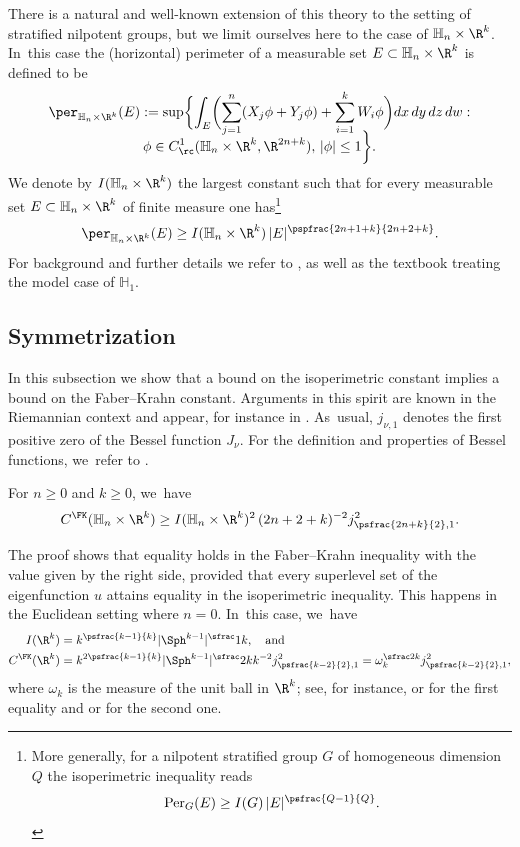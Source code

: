 There is a natural and well-known extension of this theory to the setting of stratified nilpotent groups, but we limit ourselves here to the case of $\mathbb H_n\times\R^k$. In~this case the (horizontal) perimeter of a measurable set $E\subset\mathbb H_n\times\R^k$ is defined to be
\begin{multline*}
\per_{\mathbb H_n\times\R^k}(E):=\sup\biggl\{ \int_E \biggl(\sum_{j=1}^n (X_j\phi+Y_j\phi) + \sum_{i=1}^k W_i\phi\biggr) dx\,dy\,dz\,dw : \\[-8pt]
\phi\in C^1_\rc(\mathbb H_n\times\R^k,\R^{2n+k}),\,|\phi|\leq 1\biggr\}.
\end{multline*}
We denote by $I(\mathbb H_n\times\R^k)$ the largest constant such that for every measurable set $E\subset\mathbb H_n\times\R^k$ of finite measure one has\footnote{More generally, for a nilpotent stratified group $G$ of homogeneous dimension $Q$ the isoperimetric inequality reads
\[
\mathrm{Per}_G (E) \geq I(G)\,|E|^{\psfrac{Q-1}{Q}}.
\]
}
\[
\per_{\mathbb H_n\times\R^k} (E) \geq I(\mathbb H_n\times\R^k) \,|E|^\pspfrac{2n+1+k}{2n+2+k}.
\]
For background and further details we refer to \cite{GaNh}, as well as the textbook \cite{CaDaPaTy} treating the model case of $\mathbb H_1$.

\subsection{Symmetrization}
In this subsection we show that a bound on the isoperimetric constant implies a bound on the Faber--Krahn constant. Arguments in this spirit are known in the Riemannian context and appear, for instance in \cite[Th.\,I.1.5]{BerMe}. As~usual, $j_{\nu,1}$ denotes the first positive zero of the Bessel function $J_\nu$. For the definition and properties of Bessel functions, we~refer to \cite{AbSt}.

\begin{proposition}\label{symmetrization}
For $n\geq 0$ and $k\geq 0$, we~have
\[
C^\FK(\mathbb H_n\times\R^k) \geq I(\mathbb H_n\times\R^k)^2 \,(2n+2+k)^{-2} j_{\psfrac{2n+k}{2},1}^2.
\]
\end{proposition}

The proof shows that equality holds in the Faber--Krahn inequality with the value given by the right side, provided that every superlevel set of the eigenfunction $u$ attains equality in the isoperimetric inequality. This happens in the Euclidean setting where $n=0$. In~this case, we~have
\begin{equation}
\label{eq:isofkexplicit}
\begin{aligned}
I(\R^k) &= k^\psfrac{k-1}{k} |\Sph^{k-1}|^\sfrac1k,\quad\text{and}\\
C^\FK(\R^k)&= k^{2\psfrac{k-1}{k}} |\Sph^{k-1}|^\sfrac2k k^{-2} j_{\psfrac{k-2}{2},1}^2 = \omega_k^{\sfrac2k} j_{\psfrac{k-2}{2},1}^2,
\end{aligned}
\end{equation}
where $\omega_k$ is the measure of the unit ball in $\R^k$; see, for instance, \cite[Th.\,14.1]{Ma} or \cite{Ta} for the first equality and \cite[Th.\,2.54]{FLW} or \cite[Th.\,5.1.2]{LMP} for the second one.

